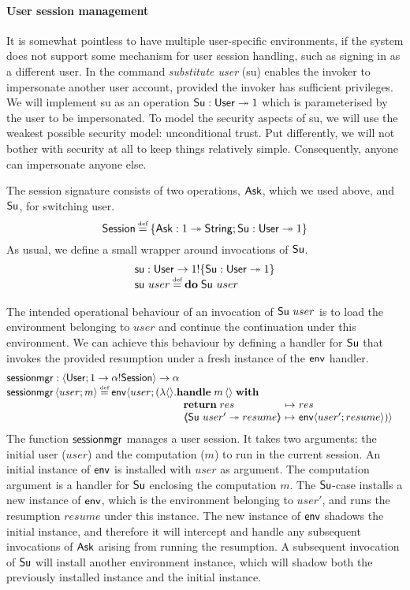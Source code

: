 \documentclass[12pt,phd,lfcs,twoside,openright,logo,leftchapter,normalheadings]{infthesis}
\theoremstyle{plain}
\theoremstyle{definition}
\begin{document}
\paragraph{User session management}
%
It is somewhat pointless to have multiple user-specific environments,
if the system does not support some mechanism for user session
handling, such as signing in as a different user.
%
In \UNIX{} the command \emph{substitute user} (su) enables the invoker
to impersonate another user account, provided the invoker has
sufficient privileges.
%
We will implement su as an operation $\mathsf{Su} : \mathsf{User} \twoheadrightarrow 1$
which is parameterised by the user to be impersonated.
%
To model the security aspects of su, we will use the weakest possible
security model: unconditional trust. Put differently, we will not
bother with security at all to keep things relatively simple.
%
Consequently, anyone can impersonate anyone else.

The session signature consists of two operations, $\mathsf{Ask}$, which we
used above, and $\mathsf{Su}$, for switching user.
%
\[
  \EnvE \defas \{\Ask : \UnitType \opto \String;\Su : \User \opto \UnitType\}
\]
%
As usual, we define a small wrapper around invocations of $\mathsf{Su}$.
%
\[
  \bl
    \su : \User \to \UnitType \eff \{\Su : \User \opto \UnitType\}\\
    \su~user \defas \Do\;\Su~user
  \el
\]
%

The intended operational behaviour of an invocation of $\mathsf{Su}~user$ is
to load the environment belonging to $user$ and continue the
continuation under this environment.
%
We can achieve this behaviour by defining a handler for $\mathsf{Su}$ that
invokes the provided resumption under a fresh instance of the
$\mathsf{env}$ handler.
%
\[
  \bl
    \sessionmgr : \Record{\User; \UnitType \to \alpha \eff \EnvE} \to \alpha\\
    \sessionmgr\,\Record{user;m} \defas
      \environment\langle{}user;(\lambda\Unit.
         \ba[t]{@{}l}
           \Handle\;m\,\Unit\;\With\\
             ~\ba{@{~}l@{~}c@{~}l}
                \Return\;res &\mapsto& res\\
                \OpCase{\Su}{user'}{resume} &\mapsto& \environment\Record{user';resume})\rangle
              \ea
         \ea
  \el
\]
%
The function $\mathsf{sessionmgr}$ manages a user session. It takes two
arguments: the initial user ($user$) and the computation ($m$) to run
in the current session. An initial instance of $\mathsf{env}$ is
installed with $user$ as argument. The computation argument is a
handler for $\mathsf{Su}$ enclosing the computation $m$. The $\mathsf{Su}$-case
installs a new instance of $\mathsf{env}$, which is the environment
belonging to $user'$, and runs the resumption $resume$ under this
instance.
%
The new instance of $\mathsf{env}$ shadows the initial instance, and
therefore it will intercept and handle any subsequent invocations of
$\mathsf{Ask}$ arising from running the resumption. A subsequent invocation of
$\mathsf{Su}$ will install another environment instance, which will shadow
both the previously installed instance and the initial instance.
%
\end{document}

